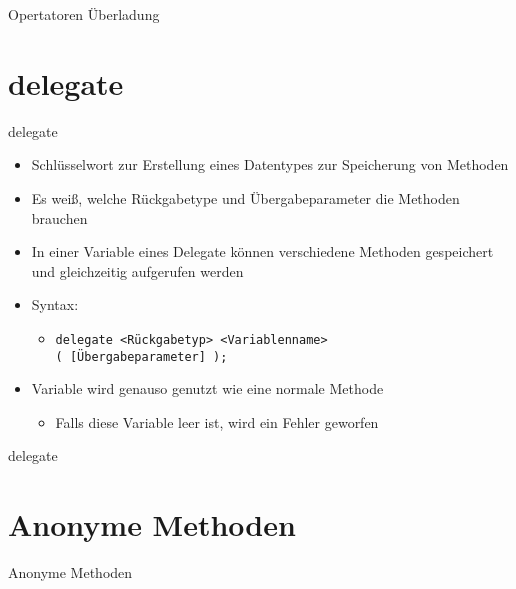 \begin{frame}{Opertatoren Überladung}
	
	
\end{frame}

\section{delegate}
\begin{frame}{delegate}
	\begin{itemize}
		\item Schlüsselwort zur Erstellung eines Datentypes zur Speicherung von Methoden
		\item Es weiß, welche Rückgabetype und Übergabeparameter die Methoden brauchen
		\item In einer Variable eines Delegate können verschiedene Methoden gespeichert und gleichzeitig aufgerufen werden
		\item Syntax:
		\begin{itemize}
			\item \texttt{delegate \alert{<Rückgabetyp> <Variablenname>}\\( \alert{[Übergabeparameter]} );}
		\end{itemize}
		\item Variable wird genauso genutzt wie eine normale Methode
		\begin{itemize}
			\item Falls diese Variable leer ist, wird ein Fehler geworfen
		\end{itemize}
	\end{itemize}
\end{frame}

\begin{frame}{delegate}
	
	
\end{frame}

\section{Anonyme Methoden}
\begin{frame}{Anonyme Methoden}

\end{frame}

